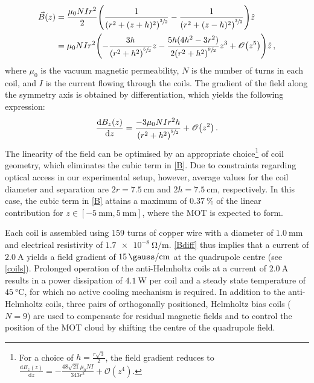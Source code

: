 \documentclass[../Thesis-IJspeert.tex]{subfiles}
\begin{document}
\begin{align}
\begin{split}
\vec{B}(z)&= \frac{\mu_0NIr^2}{2}\left(\frac{1}{\left( r^2 + (z + h)^2  \right)^{\sfrac{3}{2}}} - \frac{1}{\left( r^2 + (z - h)^2  \right)^{\sfrac{3}{2}}} \right)\hat{z}\\
&={\mu_0NIr^2}\left(-\frac{3h}{\left( r^2 + h^2  \right)^{\sfrac{5}{2}}}z - \frac{5h(4h^2-3r^2)}{2\left( r^2 + h^2  \right)^{\sfrac{9}{2}}}z^3  + \mathcal{O}\left(z^5\right) \right)\hat{z}\,,
\end{split}
\label{B}
\end{align}
where $\mu_0$ is the vacuum magnetic permeability, $N$ is the number of turns in each coil, and $I$ is the current flowing through the coils. The gradient of the field along the symmetry axis is obtained by differentiation, which yields the following expression: 
 \begin{align}
 \frac{\mathrm{d} B_z(z)}{\mathrm{d}z}= \frac{-3\mu_0NIr^2h}{\left( r^2 + h^2  \right)^{\sfrac{5}{2}}} + \mathcal{O}\left(z^2\right)\,.
 \label{Bdiff}
 \end{align}
The linearity of the field can be optimised by an appropriate choice\footnote{For a choice of $h=\frac{r\sqrt{3}}{2}$, the field gradient reduces to $\frac{\mathrm{d} B_z(z)}{\mathrm{d}z}= -\frac{48\sqrt{21} \mu_0NI }{343 r^2} + \mathcal{O}\left(z^4\right)$.} of coil geometry, which eliminates the cubic term in \autoref{B}. Due to constraints regarding optical access in our experimental setup, however, average values for the coil diameter and separation are $2r=\SI{7.5}{\centi\meter}$ and $2h=\SI{7.5}{\centi\meter}$, respectively. In this case, the cubic term in \autoref{B} attains a maximum of $\SI{0.37}{\percent}$ of the linear contribution for $z\in[\SI{-5}{\milli\meter}, \SI{5}{\milli\meter}]$, where the MOT is expected to form.

Each coil is assembled using $159$ turns of copper wire with a diameter of $\SI{1.0}{\milli\meter}$ and electrical resistivity of $\SI{1.7e-8}{\ohm\per\meter}$. \autoref{Bdiff} thus implies that a current of $\SI{2.0}{\ampere}$ yields a field gradient of $\SI{15}{\gauss\per\centi\meter}$ at the quadrupole centre (see \autoref{coils}). Prolonged operation of the anti-Helmholtz coils at a current of $\SI{2.0}{\ampere}$ results in a power dissipation of $\SI{4.1}{\watt}$ per coil and a steady state temperature of $\SI{45}{\degreeCelsius}$, for which no active cooling mechanism is required. In addition to the anti-Helmholtz coils, three pairs of orthogonally positioned, Helmholtz bias coils ($N = 9$) are used to compensate for residual magnetic fields and to control the position of the MOT cloud by shifting the centre of the quadrupole field.
\end{document}
